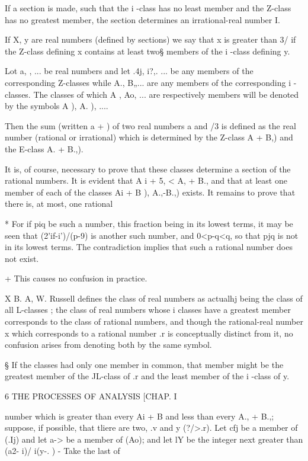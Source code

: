 If a section is made, such that the i -class has no least member and the 
Z-class has no greatest member, the section determines an irrational-real 
number I. 

If X, y are real numbers (defined by sections) we say that x is greater 
than 3/ if the Z-class defining x contains at least two§ members of the i -class 
defining y. 

Lot a,  , ... be real numbers and let .4j, i?,. ... be any members of the 
corresponding Z-classes while A., B„... are any members of the corresponding 
i -classes. The classes of which A , Ao, ... are respectively members will be 
denoted by the symbols  A ),  A. ), .... 

Then the sum (written a +  ) of two real numbers a and /3 is defined as 
the real number (rational or irrational) which is determined by the Z-class 
 A  + B,) and the E-class  A. + B.,). 

It is, of course, necessary to prove that these classes determine a section of the rational 
numbers. It is evident that A i + 5, < A, + B., and that at least one member of each of the 
classes  Ai + B ),  A.,-\-B.,) exists. It remains to prove that there is, at most, one rational 

* For if piq be such a number, this fraction being in its lowest terms, it may be seen that 
(2'if-i')/(p-9) is another such number, and 0<p-q<q, so that pjq is not in its lowest terms. 
The contradiction implies that such a rational number does not exist. 

+ This causes no confusion in practice. 

X B. A, W. Russell defines the class of real numbers as actualhj being the class of all L-classes ; 
the class of real numbers whose i classes have a greatest member corresponds to the class of 
rational numbers, and though the rational-real number x which corresponds to a rational number 
.r is conceptually distinct from it, no confusion arises from denoting both by the same symbol. 

§ If the classes had only one member in common, that member might be the greatest 
member of the JL-class of .r and the least member of the i -class of y. 



6 THE PROCESSES OF ANALYSIS [CHAP. I 

number which is greater than every Ai + B  and less than every A., + B.,; suppose, if possible, 
that tliere are two, .v and y (?/>.r). Let cfj be a member of (.Ij) and let a-> be a member 
of (Ao); and let lY be the integer next greater than (a2- i)/ i(y-. ) - Take the last of 

